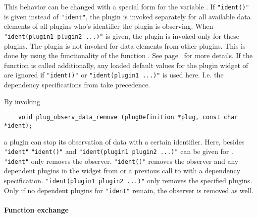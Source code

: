 This behavior can be changed with a special form for the variable
. If \verb|"ident()"| is given instead of \verb|"ident"|,
the plugin is invoked separately for all available data elements of
all plugins who's identifier the plugin is observing. When
\verb|"ident(plugin1 plugin2 ...)"| is given, the plugin is invoked
only for these plugins. The plugin is not invoked for data elements
from other plugins. This is done by using the functionality of the
function . See
page~ for more details. If the
function  is called additionally,
any loaded default values for the plugin widget of
 are ignored if \verb|"ident()"| or
\verb|"ident(plugin1 ...)"| is used here. I.e. the dependency
specifications from  take precedence.

By invoking 
\begin{small}
\linespread{0.9}
\begin{verbatim}
    void plug_observ_data_remove (plugDefinition *plug, const char *ident);
\end{verbatim}
\end{small}
a plugin can stop its observation of data with a certain
identifier. Here, besides \verb|"ident"| \verb|"ident()"| and
\verb|"ident(plugin1 plugin2 ...)"| can be given for
. \verb|"ident"| only removes the
observer. \verb|"ident()"| removes the observer and any
dependent plugins in the widget from
 or a previous call to
 with a dependency
specification. \verb|"ident(plugin1 plugin2 ...)"| only removes the
specified plugins. Only if no dependent plugins for \verb|"ident"|
remain, the observer is removed as well.

\paragraph{Function exchange}\label{para:functionExchange}\hfill\\

